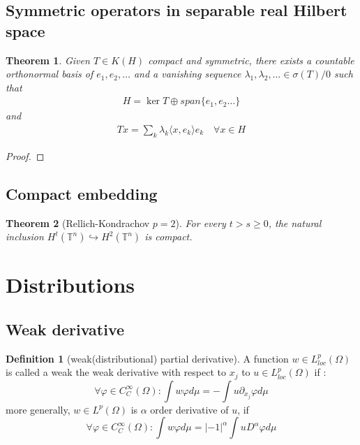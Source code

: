 \documentclass[a4paper,11pt,fleqn]{book}
\newtheorem{theorem}{Theorem}[section]
\theoremstyle{definition}
\newtheorem{definition}{Definition}[section]
\theoremstyle{remark}
\begin{document}
\subsection{Symmetric operators in separable real Hilbert space}
\begin{theorem}
	Given $T \in K(H)$ compact and symmetric, there exists a countable orthonormal basis of $e_1, e_2, \dots$ and a vanishing sequence $\lambda_1, \lambda_2, \dots \in \sigma(T)\slash 0 $ such that 
	\begin{align*}
		H = \ker T \oplus span\{e_1, e_2 \dots \}
	\end{align*}
	and 
	\begin{align*}
		Tx = \sum_k \lambda_k \langle x, e_k\rangle e_k \quad \forall x \in H
	\end{align*}
\end{theorem}
\begin{proof}
\end{proof}

\subsection{Compact embedding}
\begin{theorem}[Rellich-Kondrachov $p = 2$]
	For every $t > s \geq 0$, the natural inclusion $H^t(\mathbb{T}^n) \hookrightarrow H^2(\mathbb{T}^n)$ is compact. 
\end{theorem}






\newpage
\section{Distributions}
\subsection{Weak derivative}
\begin{definition}[weak(distributional) partial derivative]
	A function $w \in L^p_{loc}(\Omega)$ is called a weak the weak derivative with respect to $x_j$ to $u \in L^p_{loc}(\Omega)$ if :
	\begin{equation*}
		\forall \varphi \in C^\infty_C(\Omega): \int w \varphi d\mu = -\int u \partial_{x_j} \varphi d\mu  
	\end{equation*}
	more generally, $w \in L^p(\Omega)$ is $\alpha$ order derivative of $u$, if
	\begin{equation*}
		\forall \varphi \in C^\infty_C(\Omega): \int w \varphi d\mu = |-1|^\alpha \int u D^\alpha \varphi d\mu
	\end{equation*}
\end{definition}
\end{document}
